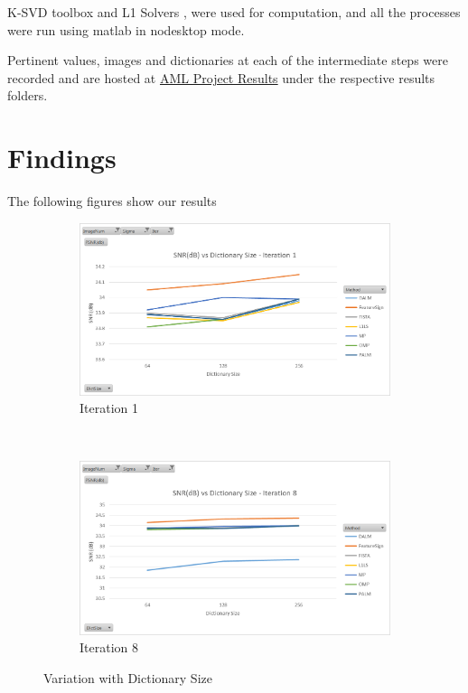 \documentclass{article} %
\begin{document}
K-SVD toolbox \citep{rubinstein2008efficient} and L1 Solvers \citep{yang2010fast}, \citep{lee2007efficient} were used for computation, and all the processes were run using matlab in nodesktop mode.

Pertinent values, images and dictionaries at each of the intermediate steps were recorded and are hosted at \href{https://github.com/dkdfirefly/aml}{AML Project Results} under the respective results folders.

\vspace{.2cm}
\section{Findings}
\vspace{.2cm}
The following figures show our results

\begin{figure}[h]
        \centering
        \begin{subfigure}[b]{0.5\textwidth}
                \includegraphics[width=\textwidth]{images/graph1}
                \caption{Iteration 1}
                \label{fig:dictSizeVar1}
        \end{subfigure}%
        ~ %
        \begin{subfigure}[b]{0.5\textwidth}
                \includegraphics[width=\textwidth]{images/graph2}
                \caption{Iteration 8}
                \label{fig:dictSizeVar8}
        \end{subfigure}
        \caption{Variation with Dictionary Size}\label{fig:dictSizeVar}
\end{figure}
\end{document}
